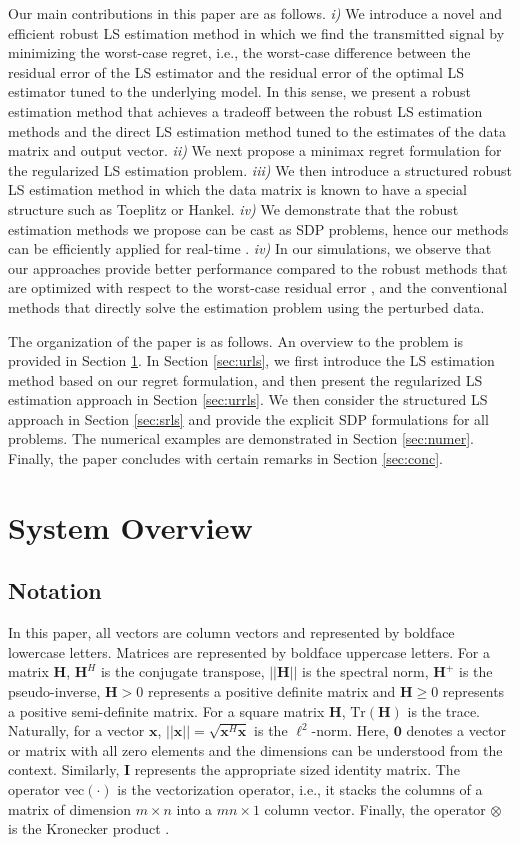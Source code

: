 \documentclass[review,sort&compress]{elsarticle}
\renewcommand{\vec}[1]{\mbox{$\mathbf{#1}$}}
\newcommand{\norm}[1]{\left|\left|#1\right|\right|}
\newcommand{\tr}{\mathrm{Tr}}
\newcommand{\col}{\mathrm{vec}}
\newcommand{\vH}{\vec{H}}
\newcommand{\vx}{\vec{x}}
\newcommand{\vI}{\vec{I}}
\begin{document}
Our main contributions in this paper are as follows. {\em i)} We introduce a novel and efficient robust LS estimation method in which we find the transmitted signal by minimizing the worst-case regret, i.e., the worst-case difference
between the residual error of the LS estimator and the residual error of the optimal LS estimator tuned to the underlying model. In this sense, we present a robust estimation method that achieves a tradeoff between the robust LS estimation methods and the direct LS estimation method tuned to the estimates of the data matrix and output vector. {\em ii)} We next propose a minimax regret formulation for the regularized LS estimation problem. {\em iii)} We then introduce a structured robust LS estimation method in which the data matrix is known to have a special structure such as Toeplitz or Hankel. {\em iv)} We demonstrate that the robust estimation methods we propose can be cast as SDP problems, hence our methods can be efficiently applied for real-time \cite{boyd}. {\em iv)} In our simulations, we observe that our approaches provide better performance compared to the robust methods that are optimized with respect to the worst-case residual error \cite{est1, est2}, and the conventional methods that directly solve the estimation problem using the perturbed data.

The organization of the paper is as follows. An overview to the problem is provided in Section \ref{sec:system}. In Section \ref{sec:urls}, we first introduce the LS estimation method based on our regret formulation, and then present the regularized LS estimation approach in Section \ref{sec:urrls}. We then consider the structured LS approach in Section \ref{sec:srls} and provide the explicit SDP formulations for all problems. The numerical examples are demonstrated in Section \ref{sec:numer}. Finally, the paper concludes with certain remarks in Section \ref{sec:conc}.

\section{System Overview} \label{sec:system}
\subsection{Notation}
In this paper, all vectors are column vectors and represented by boldface lowercase letters. Matrices are represented by boldface uppercase letters. For a matrix $\vH$, $\vH^H$ is the conjugate transpose, $\norm{\vH}$ is the spectral norm, $\vH^+$ is the pseudo-inverse, $\vH > 0$ represents a positive definite matrix and $\vH \geq 0$ represents a positive semi-definite matrix. For a square matrix $\vH$, $\tr(\vH)$ is the trace. Naturally, for a vector $\vx$, $\norm{\vx} = \sqrt{\vx^H \vx}$ is the $\ell^2$-norm. Here, $\vec{0}$ denotes a vector or matrix with all zero elements and the dimensions can be understood from the context. Similarly, $\vI$ represents the appropriate sized identity matrix. The operator $\col(\cdot)$ is the vectorization operator, i.e., it stacks the columns of a matrix of dimension $m\times n$ into a $mn \times 1$ column vector. Finally, the operator $\otimes$ is the Kronecker product \cite{graham}.
\end{document}
